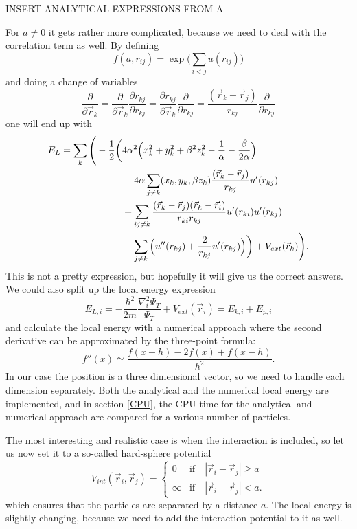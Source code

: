 \documentclass[norsk,a4paper,12pt]{article}
\begin{document}
INSERT ANALYTICAL EXPRESSIONS FROM A

For $a\neq0$ it gets rather more complicated, because we need to deal with the correlation term as well. By defining
\begin{equation}
f(a, r_{ij})=\exp{\bigg(\sum_{i<j}u(r_{ij})\bigg)}
\end{equation}
and doing a change of variables
\begin{equation}
\frac{\partial}{\partial \vec{r}_k}=\frac{\partial}{\partial \vec{r}_k}\frac{\partial r_{kj}}{\partial r_{kj}}=\frac{\partial r_{kj}}{\partial \vec{r}_k}\frac{\partial}{\partial r_{kj}}=\frac{(\vec{r}_k-\vec{r}_j)}{r_{kj}}\frac{\partial}{\partial r_{kj}}
\end{equation}
one will end up with
\begin{align}
E_L=\sum_k\Bigg(-\frac{1}{2}\bigg(&4\alpha^2\Big(x_k^2+y_k^2+\beta^2z_k^2-\frac{1}{\alpha}-\frac{\beta}{2\alpha}\Big)\notag\\
&-4\alpha\sum_{j\neq k}(x_k, y_k, \beta z_k)\frac{(\vec{r}_k-\vec{r}_j)}{r_{kj}}u'(r_{kj})\\
&+\sum_{ij\neq k}\frac{(\vec{r}_k-\vec{r}_j)(\vec{r}_k-\vec{r}_i)}{r_{ki}r_{kj}}u'(r_{ki})u'(r_{kj})\notag\\
&+\sum_{j\neq k}\Big(u''(r_{kj})+\frac{2}{r_{kj}}u'(r_{kj})\Big)\bigg)+V_{ext}(\vec{r}_k)\Bigg).\notag
\label{EL_total}
\end{align}
This is not a pretty expression, but hopefully it will give us the correct answers. We could also split up the local energy expression 
\begin{equation}
E_{L,i}=-\frac{\hbar^2}{2m}\frac{\nabla_i^2\Psi_T}{\Psi_T}+V_{ext}(\vec{r}_i)=E_{k,i}+E_{p,i}
\end{equation}
and calculate the local energy with a numerical approach where the second derivative can be approximated by the three-point formula:
\begin{equation}
f''(x)\simeq\frac{f(x+h)-2f(x)+f(x-h)}{h^2}.
\end{equation}
In our case the position is a three dimensional vector, so we need to handle each dimension separately. Both the analytical and the numerical local energy are implemented, and in section \ref{CPU}, the CPU time for the analytical and numerical approach are compared for a various number of particles. 

The most interesting and realistic case is when the interaction is included, so let us now set it to a so-called hard-sphere potential
\begin{equation}
V_{int}(\vec{r}_i, \vec{r}_j)=
\begin{cases} 
   0 & \text{if}\quad |\vec{r}_i-\vec{r}_j| \geq a \\
   \infty & \text{if}\quad |\vec{r}_i-\vec{r}_j| < a.
\end{cases}
\end{equation}
which ensures that the particles are separated by a distance $a$. The local energy is slightly changing, because we need to add the interaction potential to it as well. 
\end{document}
